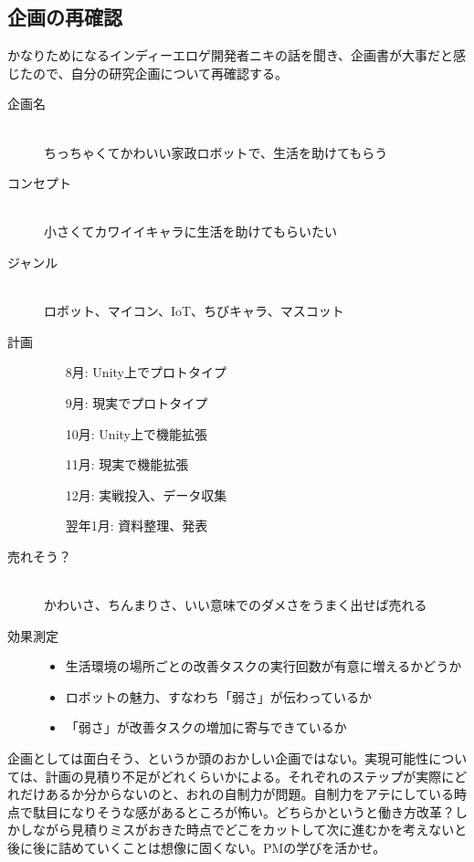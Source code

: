 \documentclass[twocolumn]{mynote}
\begin{document}
\subsection*{企画の再確認}
かなりためになるインディーエロゲ開発者ニキの話を聞き、企画書が大事だと感じたので、自分の研究企画について再確認する。
\begin{description}
  \item[企画名]\mbox{}\\
    ちっちゃくてかわいい家政ロボットで、生活を助けてもらう
  \item[コンセプト]\mbox{}\\
    小さくてカワイイキャラに生活を助けてもらいたい
  \item[ジャンル]\mbox{}\\
    ロボット、マイコン、IoT、ちびキャラ、マスコット
  \item[計画]\mbox{}
    \begin{itemize}
      \item[8月: ]Unity上でプロトタイプ
      \item[9月: ]現実でプロトタイプ
      \item[10月: ]Unity上で機能拡張
      \item[11月: ]現実で機能拡張
      \item[12月: ]実戦投入、データ収集
      \item[翌年1月: ]資料整理、発表
    \end{itemize}
  \item[売れそう？]\mbox{}\\
    かわいさ、ちんまりさ、いい意味でのダメさをうまく出せば売れる
  \item[効果測定]\mbox{}
    \begin{itemize}
      \item 生活環境の場所ごとの改善タスクの実行回数が有意に増えるかどうか
      \item ロボットの魅力、すなわち「弱さ」が伝わっているか
      \item 「弱さ」が改善タスクの増加に寄与できているか
    \end{itemize}
\end{description}

企画としては面白そう、というか頭のおかしい企画ではない。実現可能性については、計画の見積り不足がどれくらいかによる。それぞれのステップが実際にどれだけあるか分からないのと、おれの自制力が問題。自制力をアテにしている時点で駄目になりそうな感があるところが怖い。どちらかというと働き方改革？しかしながら見積りミスがおきた時点でどこをカットして次に進むかを考えないと後に後に詰めていくことは想像に固くない。PMの学びを活かせ。
\end{document}
